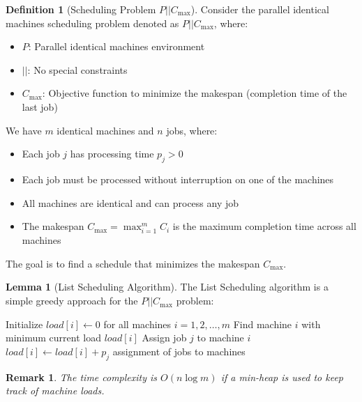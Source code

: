 \documentclass{article}
\newtheorem{remark}{Remark}
\theoremstyle{definition}
\newtheorem{lemma}{Lemma}
\newtheorem{definition}{Definition}
\begin{document}
\begin{definition}[Scheduling Problem $P||C_{\max}$]
Consider the parallel identical machines scheduling problem denoted as $P||C_{\max}$, where:
\begin{itemize}
    \item $P$: Parallel identical machines environment
    \item $||$: No special constraints
    \item $C_{\max}$: Objective function to minimize the makespan (completion time of the last job)
\end{itemize}

We have $m$ identical machines and $n$ jobs, where:
\begin{itemize}
    \item Each job $j$ has processing time $p_j > 0$
    \item Each job must be processed without interruption on one of the machines
    \item All machines are identical and can process any job
    \item The makespan $C_{\max} = \max_{i=1}^{m} C_i$ is the maximum completion time across all machines
\end{itemize}

The goal is to find a schedule that minimizes the makespan $C_{\max}$.
\end{definition}

\begin{lemma}[List Scheduling Algorithm]
The List Scheduling algorithm is a simple greedy approach for the $P||C_{\max}$ problem:

\begin{algorithm}
\caption{List Scheduling}
\begin{algorithmic}[1]
    \State Initialize $load[i] \gets 0$ for all machines $i = 1, 2, \ldots, m$ 
     
        \State Find machine $i$ with minimum current load $load[i]$
        \State Assign job $j$ to machine $i$
        \State $load[i] \gets load[i] + p_j$ 
    \EndFor
    \State \Return assignment of jobs to machines
\EndProcedure
\end{algorithmic}
\end{algorithm}

\begin{remark}
The time complexity is $O(n \log m)$ if a min-heap is used to keep track of machine loads.
\end{remark}
\end{lemma}
\end{document}
